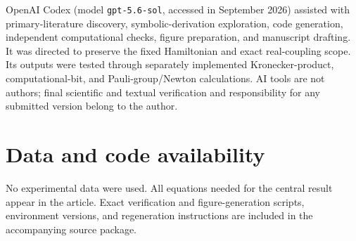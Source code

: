 \documentclass[
  aps,
  pra,
  reprint,
  superscriptaddress,
  nofootinbib,
  longbibliography
]{revtex4-2}
\begin{document}
\begin{acknowledgments}
OpenAI Codex (model \texttt{gpt-5.6-sol}, accessed in September 2026) assisted with
primary-literature discovery, symbolic-derivation exploration, code generation,
independent computational checks, figure preparation, and manuscript drafting.  It
was directed to preserve the fixed Hamiltonian and exact real-coupling scope.  Its
outputs were tested through separately implemented Kronecker-product,
computational-bit, and Pauli-group/Newton calculations.  AI tools are not authors;
final scientific and textual verification and responsibility for any submitted
version belong to the author.
\end{acknowledgments}

\section*{Data and code availability}
No experimental data were used.  All equations needed for the central result appear in
the article.  Exact verification and figure-generation scripts, environment versions,
and regeneration instructions are included in the accompanying source package.


\end{document}
